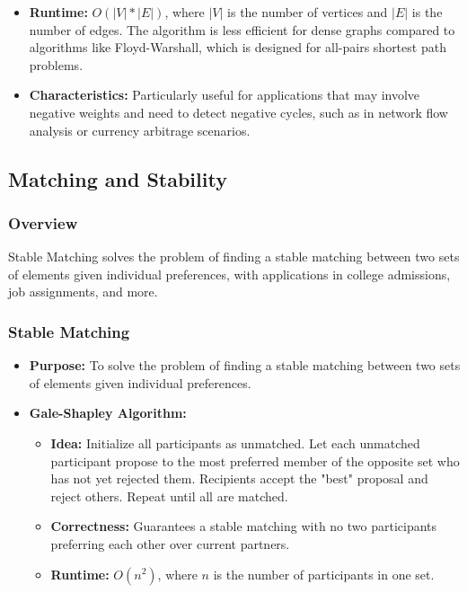 \documentclass[landscape,7pt]{extarticle}
\begin{document}
\begin{multicols*}{3}
\begin{itemize}
    \item \textbf{Runtime:} $O(|V| * |E|)$, where $|V|$ is the number of vertices and $|E|$ is the number of edges. The algorithm is less efficient for dense graphs compared to algorithms like Floyd-Warshall, which is designed for all-pairs shortest path problems.
    \item \textbf{Characteristics:} Particularly useful for applications that may involve negative weights and need to detect negative cycles, such as in network flow analysis or currency arbitrage scenarios.
\end{itemize}

\subsection*{Matching and Stability}

\subsubsection*{Overview}
Stable Matching solves the problem of finding a stable matching between two sets of elements given individual preferences, with applications in college admissions, job assignments, and more.

\subsubsection*{Stable Matching}
\begin{itemize}
\item \textbf{Purpose:} To solve the problem of finding a stable matching between two sets of elements given individual preferences.
\item \textbf{Gale-Shapley Algorithm:}
\begin{itemize}
\item \textbf{Idea:} Initialize all participants as unmatched. Let each unmatched participant propose to the most preferred member of the opposite set who has not yet rejected them. Recipients accept the "best" proposal and reject others. Repeat until all are matched.
\item \textbf{Correctness:} Guarantees a stable matching with no two participants preferring each other over current partners.
\item \textbf{Runtime:} $O(n^2)$, where $n$ is the number of participants in one set.
\end{itemize}
\end{itemize}


\end{multicols*}
\end{document}
